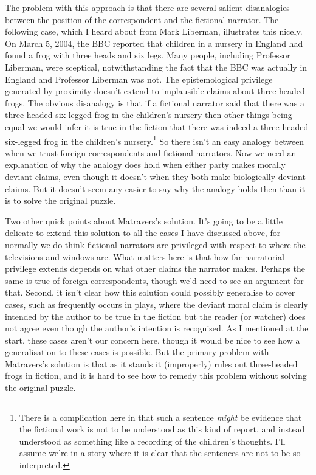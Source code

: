 The problem with this approach is that there are several salient disanalogies between the position of the correspondent and the fictional narrator. The following case, which I heard about from Mark Liberman, illustrates this nicely. On March 5, 2004, the BBC reported that children in a nursery in England had found a frog with three heads and six legs. Many people, including Professor Liberman, were sceptical, notwithstanding the fact that the BBC was actually in England and Professor Liberman was not. The epistemological privilege generated by proximity doesn't extend to implausible claims about three-headed frogs. The obvious disanalogy is that if a fictional narrator said that there was a three-headed six-legged frog in the children's nursery then other things being equal we would infer it is true in the fiction that there was indeed a three-headed six-legged frog in the children's nursery.\footnote{There is a complication here in that such a sentence \textit{might} be evidence that the fictional work is not to be understood as this kind of report, and instead understood as something like a recording of the children's thoughts. I'll assume we're in a story where it is clear that the sentences are not to be so interpreted.} So there isn't an easy analogy between when we trust foreign correspondents and fictional narrators. Now we need an explanation of why the analogy does hold when either party makes morally deviant claims, even though it doesn't when they both make biologically deviant claims. But it doesn't seem any easier to say why the analogy holds then than it is to solve the original puzzle.

Two other quick points about Matravers's solution. It's going to be a little delicate to extend this solution to all the cases I have discussed above, for normally we do think fictional narrators are privileged with respect to where the televisions and windows are. What matters here is that how far narratorial privilege extends depends on what other claims the narrator makes. Perhaps the same is true of foreign correspondents, though we'd need to see an argument for that. Second, it isn't clear how this solution could possibly generalise to cover cases, such as frequently occurs in plays, where the deviant moral claim is clearly intended by the author to be true in the fiction but the reader (or watcher) does not agree even though the author's intention is recognised. As I mentioned at the start, these cases aren't our concern here, though it would be nice to see how a generalisation to these cases is possible. But the primary problem with Matravers's solution is that as it stands it (improperly) rules out three-headed frogs in fiction, and it is hard to see how to remedy this problem without solving the original puzzle.

